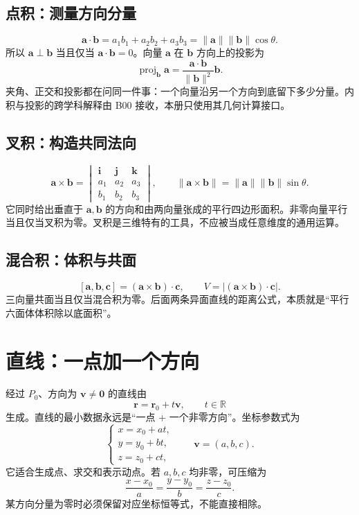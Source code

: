 \documentclass[11pt,a4paper]{ctexart}
\begin{document}
\subsection{点积：测量方向分量}

\[
\mathbf a\cdot\mathbf b=a_1b_1+a_2b_2+a_3b_3
=\lVert\mathbf a\rVert\lVert\mathbf b\rVert\cos\theta.
\]
所以 $\mathbf a\perp\mathbf b$ 当且仅当 $\mathbf a\cdot\mathbf b=0$。向量 $\mathbf a$ 在 $\mathbf b$ 方向上的投影为
\[
\operatorname{proj}_{\mathbf b}\mathbf a
=\frac{\mathbf a\cdot\mathbf b}{\lVert\mathbf b\rVert^2}\mathbf b.
\]
夹角、正交和投影都在问同一件事：一个向量沿另一个方向到底留下多少分量。内积与投影的跨学科解释由 B00 接收，本册只使用其几何计算接口。

\subsection{叉积：构造共同法向}

\[
\mathbf a\times\mathbf b
=
\begin{vmatrix}
\mathbf i&\mathbf j&\mathbf k\\
a_1&a_2&a_3\\
b_1&b_2&b_3
\end{vmatrix},
\qquad
\lVert\mathbf a\times\mathbf b\rVert
=\lVert\mathbf a\rVert\lVert\mathbf b\rVert\sin\theta.
\]
它同时给出垂直于 $\mathbf a,\mathbf b$ 的方向和由两向量张成的平行四边形面积。非零向量平行当且仅当叉积为零。叉积是三维特有的工具，不应被当成任意维度的通用运算。

\subsection{混合积：体积与共面}

\[
[\mathbf a,\mathbf b,\mathbf c]
=(\mathbf a\times\mathbf b)\cdot\mathbf c,
\qquad
V=\left\lvert(\mathbf a\times\mathbf b)\cdot\mathbf c\right\rvert.
\]
三向量共面当且仅当混合积为零。后面两条异面直线的距离公式，本质就是“平行六面体体积除以底面积”。

\section{直线：一点加一个方向}

经过 $P_0$、方向为 $\mathbf v\ne\mathbf0$ 的直线由
\[
\boxed{\mathbf r=\mathbf r_0+t\mathbf v,\qquad t\in\mathbb R}
\]
生成。直线的最小数据永远是“一点 + 一个非零方向”。坐标参数式为
\[
\begin{cases}
x=x_0+at,\\y=y_0+bt,\\z=z_0+ct,
\end{cases}
\qquad \mathbf v=(a,b,c).
\]
它适合生成点、求交和表示动点。若 $a,b,c$ 均非零，可压缩为
\[
\frac{x-x_0}{a}=\frac{y-y_0}{b}=\frac{z-z_0}{c}.
\]
某方向分量为零时必须保留对应坐标恒等式，不能直接相除。
\end{document}
